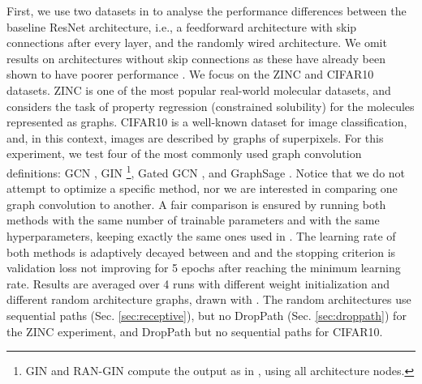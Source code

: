 \documentclass[10pt,twocolumn,twoside]{IEEEtran}
\begin{document}
First, we use two datasets in \cite{dwivedi2020benchmarking} to analyse the performance differences between the baseline ResNet architecture, i.e., a feedforward architecture with skip connections after every layer, and the randomly wired architecture. We omit results on architectures without skip connections as these have already been shown to have poorer performance \cite{dwivedi2020benchmarking}.
We focus on the ZINC and CIFAR10 datasets. ZINC is one of the most popular real-world molecular datasets, and considers the task of property regression (constrained solubility) for the molecules represented as graphs. CIFAR10 is a well-known dataset for image classification, and, in this context, images are described by graphs of superpixels. 
For this experiment, we test four of the most commonly used graph convolution definitions: GCN \cite{kipf2016semi}, GIN \cite{xu2018powerful}\footnote{GIN and RAN-GIN compute the output as in \cite{xu2018representation}, using all architecture nodes.}, Gated GCN \cite{bresson2017residual}, and GraphSage \cite{hamilton2017inductive}. Notice that we do not attempt to optimize a specific method, nor we are interested in comparing one graph convolution to another. A fair comparison is ensured by running both methods with the same number of trainable parameters and with the same hyperparameters, keeping exactly the same ones used in \cite{dwivedi2020benchmarking}. The learning rate of both methods is adaptively decayed between  and  and the stopping criterion is validation loss not improving for 5 epochs after reaching the minimum learning rate. Results are averaged over 4 runs with different weight initialization and different random architecture graphs, drawn with . The random architectures use sequential paths (Sec. \ref{sec:receptive}), but no DropPath (Sec. \ref{sec:droppath}) for the ZINC experiment, and DropPath but no sequential paths for CIFAR10.
\end{document}
